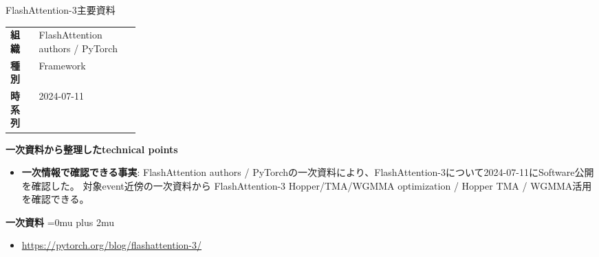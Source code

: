 \begin{technicalnote}{FlashAttention-3}{主要資料}
\begingroup
\begin{tabularx}{\linewidth}{@{}>{\bfseries}p{0.22\linewidth}X@{}}
組織 & FlashAttention authors / PyTorch \\
種別 & Framework \\
時系列 & 2024-07-11 \\
\end{tabularx}
\smallskip
{\bfseries 一次資料から整理したtechnical points}
\begin{itemize}[leftmargin=1.5em,itemsep=0.35em]
\item \textbf{一次情報で確認できる事実}: FlashAttention authors / PyTorchの一次資料により、FlashAttention-3について2024-07-11にSoftware公開を確認した。 対象event近傍の一次資料から FlashAttention-3 Hopper/TMA/WGMMA optimization / Hopper TMA / WGMMA活用 を確認できる。
\end{itemize}
\begin{minipage}{\linewidth}
\begin{samepage}
{\bfseries 一次資料}
\begingroup\sloppy
\Urlmuskip=0mu plus 2mu\relax
\begin{itemize}[leftmargin=1.5em,itemsep=0.25em]
\item {\scriptsize\url{https://pytorch.org/blog/flashattention-3/}}
\end{itemize}
\endgroup
\end{samepage}
\end{minipage}
\endgroup
\end{technicalnote}
\medskip

